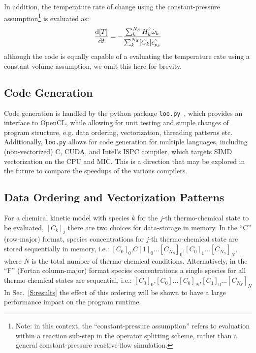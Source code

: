 \documentclass[12pt]{ussci}
\begin{document}
In addition, the temperature rate of change using the constant-pressure assumption\footnote{Note: in this context, the ``constant-pressure assumption'' refers to evaluation within a reaction sub-step in the operator splitting scheme, rather than a general constant-pressure reactive-flow simulation.} is evaluated as:
\begin{equation}
\frac{\text{d}[T]}{\text{d}t} = -\frac{\sum_{k}^{N_S} H^{\degree}_k \dot{\omega}_k}{\sum_{k}^{N_S} [C_k] c_{p_k}^{\degree}}
\end{equation}
although the code is equally capable of a evaluating the temperature rate using a constant-volume assumption, we omit this here for brevity.

\subsection{Code Generation}
Code generation is handled by the python package \texttt{loo.py}~\cite{kloeckner_loopy_2014}, which provides an interface to OpenCL, while allowing for unit testing and simple changes of program structure, e.g. data ordering, vectorization, threading patterns etc.
Additionally, \texttt{loo.py} allows for code generation for multiple languages, including (non-vectorized) C, CUDA, and Intel's ISPC compiler, which targets SIMD vectorization on the CPU and MIC.
This is a direction that may be explored in the future to compare the speedups of the various compilers.

\subsection{Data Ordering and Vectorization Patterns}
For a chemical kinetic model with species $k$ for the $j$-th thermo-chemical state to be evaluated, $[C_k]_j$ there are two choices for data-storage in memory.
In the ``C'' (row-major) format, species concentrations for $j$-th thermo-chemical state are stored sequentially in memory, i.e.: $[C_0]_0\text{,}\allowbreak C[1]_0\ldots\allowbreak [C_{N_S}]_0\text{,}\allowbreak [C_0]_1\allowbreak\ldots\allowbreak [C_{N_S}]_N$, where $N$ is the total number of thermo-chemical conditions.
Alternatively, in the ``F'' (Fortan column-major) format species concentrations a single species for all thermo-chemical states are sequential, i.e.: $[C_0]_0\text{,}\allowbreak[C_0]\ldots\allowbreak[C_0]_N\text{,}\allowbreak[C_1]_0\ldots\allowbreak[C_{N_S}]_N$
In Sec.~\ref{S:results} the effect of this ordering will be shown to have a large performance impact on the program runtime.
\end{document}
